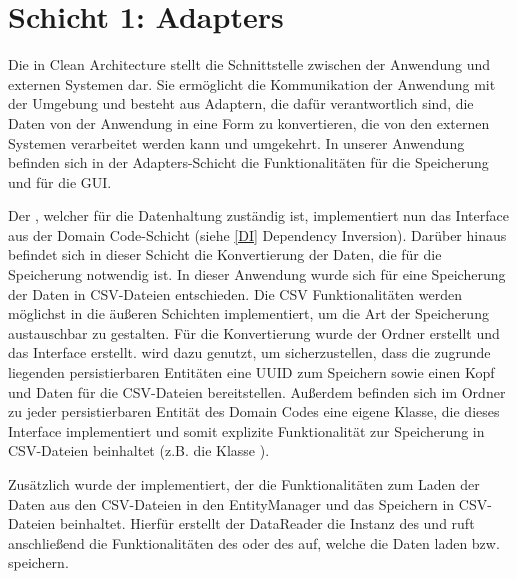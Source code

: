 \section{Schicht 1: Adapters}
Die \href{https://github.com/MichaelaHaag/RezeptApp/tree/main/1-Adapter}{} in Clean Architecture stellt die Schnittstelle zwischen der Anwendung und externen Systemen dar. Sie ermöglicht die Kommunikation der Anwendung mit der Umgebung und besteht aus Adaptern, die dafür verantwortlich sind, die Daten von der Anwendung in eine Form zu konvertieren, die von den externen Systemen verarbeitet werden kann und umgekehrt. In unserer Anwendung befinden sich in der Adapters-Schicht die Funktionalitäten für die Speicherung und für die GUI. 

Der \href{https://github.com/MichaelaHaag/RezeptApp/tree/main/1-Adapter/src/main/java/de/rezeptapp/adapter/Datenpersistenz/EntityManager.java}{}, welcher für die Datenhaltung zuständig ist, implementiert nun das Interface  aus der Domain Code-Schicht (siehe \autoref{DI} Dependency Inversion). Darüber hinaus befindet sich in dieser Schicht die Konvertierung der Daten, die für die Speicherung notwendig ist. In dieser Anwendung wurde sich für eine Speicherung der Daten in CSV-Dateien entschieden. Die CSV Funktionalitäten werden möglichst in die äußeren Schichten implementiert, um die Art der Speicherung austauschbar zu gestalten. 
Für die Konvertierung wurde der Ordner \href{https://github.com/MichaelaHaag/RezeptApp/tree/main/1-Adapter/src/main/java/de/rezeptapp/adapter/Datenpersistenz}{} erstellt und das Interface \href{https://github.com/MichaelaHaag/RezeptApp/blob/main/1-Adapter/src/main/java/de/rezeptapp/adapter/Datenpersistenz/ICSVPersistierbar.java}{} erstellt.  wird dazu genutzt, um sicherzustellen, dass die zugrunde liegenden persistierbaren Entitäten eine UUID zum Speichern sowie einen Kopf und Daten für die CSV-Dateien bereitstellen. Außerdem befinden sich im Ordner zu jeder persistierbaren Entität des Domain Codes eine eigene Klasse, die dieses Interface implementiert und somit explizite Funktionalität zur Speicherung in CSV-Dateien beinhaltet (z.B. die Klasse \href{https://github.com/MichaelaHaag/RezeptApp/blob/main/1-Adapter/src/main/java/de/rezeptapp/adapter/Datenpersistenz/CSVZutat.java}{}). 

Zusätzlich wurde der \href{https://github.com/MichaelaHaag/RezeptApp/tree/main/1-Adapter/src/main/java/de/rezeptapp/adapter/Datenpersistenz/DataReader.java}{} implementiert, der die Funktionalitäten zum Laden der Daten aus den CSV-Dateien in den EntityManager und das Speichern in CSV-Dateien beinhaltet. Hierfür erstellt der DataReader die Instanz des  und ruft anschließend die Funktionalitäten des  oder des  auf, welche die Daten laden bzw. speichern. 

